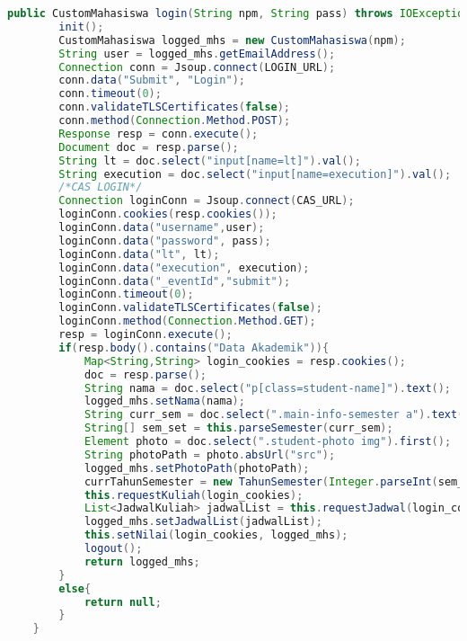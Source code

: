 \begin{lstlisting}[language=Java,basicstyle=\tiny,caption=Scraper.java]
    public CustomMahasiswa login(String npm, String pass) throws IOException{
        init();
    	CustomMahasiswa logged_mhs = new CustomMahasiswa(npm);	
        String user = logged_mhs.getEmailAddress();
        Connection conn = Jsoup.connect(LOGIN_URL);
        conn.data("Submit", "Login");
        conn.timeout(0);
        conn.validateTLSCertificates(false);
        conn.method(Connection.Method.POST);
        Response resp = conn.execute();
        Document doc = resp.parse();
        String lt = doc.select("input[name=lt]").val();
        String execution = doc.select("input[name=execution]").val();
        /*CAS LOGIN*/
        Connection loginConn = Jsoup.connect(CAS_URL);
        loginConn.cookies(resp.cookies());
        loginConn.data("username",user);
        loginConn.data("password", pass);
        loginConn.data("lt", lt);
        loginConn.data("execution", execution);
        loginConn.data("_eventId","submit");
        loginConn.timeout(0);
        loginConn.validateTLSCertificates(false);
        loginConn.method(Connection.Method.GET);
        resp = loginConn.execute();
        if(resp.body().contains("Data Akademik")){
        	Map<String,String> login_cookies = resp.cookies();
            doc = resp.parse();
            String nama = doc.select("p[class=student-name]").text();
            logged_mhs.setNama(nama);
            String curr_sem = doc.select(".main-info-semester a").text();
            String[] sem_set = this.parseSemester(curr_sem);
            Element photo = doc.select(".student-photo img").first();
            String photoPath = photo.absUrl("src"); 
            logged_mhs.setPhotoPath(photoPath);
            currTahunSemester = new TahunSemester(Integer.parseInt(sem_set[0]),Semester.fromString(sem_set[1]));
            this.requestKuliah(login_cookies);
            List<JadwalKuliah> jadwalList = this.requestJadwal(login_cookies);
            logged_mhs.setJadwalList(jadwalList);
            this.setNilai(login_cookies, logged_mhs);
            logout();
            return logged_mhs;
        }       
        else{
            return null;
        }
    }
    

\end{lstlisting}
